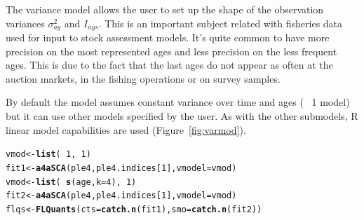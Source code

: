 \documentclass[a4paper,english,10pt]{article}\usepackage[]{graphicx}\usepackage[]{color}
\makeatletter
\newcommand{\hlnum}[1]{\textcolor[rgb]{0.686,0.059,0.569}{#1}}%
\newcommand{\hlopt}[1]{\textcolor[rgb]{0,0,0}{#1}}%
\newcommand{\hlstd}[1]{\textcolor[rgb]{0.345,0.345,0.345}{#1}}%
\newcommand{\hlkwb}[1]{\textcolor[rgb]{0.69,0.353,0.396}{#1}}%
\newcommand{\hlkwc}[1]{\textcolor[rgb]{0.333,0.667,0.333}{#1}}%
\newcommand{\hlkwd}[1]{\textcolor[rgb]{0.737,0.353,0.396}{\textbf{#1}}}%
\newenvironment{kframe}{%
 \def\at@end@of@kframe{}%
 \ifinner\ifhmode%
  \def\at@end@of@kframe{\end{minipage}}%
  \begin{minipage}{\columnwidth}%
 \fi\fi%
 \def\FrameCommand##1{\hskip\@totalleftmargin \hskip-\fboxsep
 \colorbox{shadecolor}{##1}\hskip-\fboxsep
     \hskip-\linewidth \hskip-\@totalleftmargin \hskip\columnwidth}%
 \MakeFramed {\advance\hsize-\width
   \@totalleftmargin\z@ \linewidth\hsize
   \@setminipage}}%
 {\par\unskip\endMakeFramed%
 \at@end@of@kframe}
\newenvironment{knitrout}{}{} %
\makeatother
\begin{document}
The variance model allows the user to set up the shape of the observation variances $\sigma^2_{ay}$ and $I_{ays}$. This is an important subject related with fisheries data used for input to stock assessment models. It's quite common to have more precision on the most represented ages and less precision on the less frequent ages. This is due to the fact that the last ages do not appear as often at the auction markets, in the fishing operations or on survey samples.

By default the model assumes constant variance over time and ages (~ 1 model) but it can use other models specified by the user. As with the other submodels, R linear model capabilities are used (Figure~\ref{fig:varmod}).

\begin{knitrout}
\color{fgcolor}\begin{kframe}
\begin{alltt}
\hlstd{vmod} \hlkwb{<-} \hlkwd{list}\hlstd{(}\hlopt{~}\hlnum{1}\hlstd{,} \hlopt{~}\hlnum{1}\hlstd{)}
\hlstd{fit1} \hlkwb{<-} \hlkwd{a4aSCA}\hlstd{(ple4, ple4.indices[}\hlnum{1}\hlstd{],} \hlkwc{vmodel} \hlstd{= vmod)}
\hlstd{vmod} \hlkwb{<-} \hlkwd{list}\hlstd{(}\hlopt{~}\hlkwd{s}\hlstd{(age,} \hlkwc{k} \hlstd{=} \hlnum{4}\hlstd{),} \hlopt{~}\hlnum{1}\hlstd{)}
\hlstd{fit2} \hlkwb{<-} \hlkwd{a4aSCA}\hlstd{(ple4, ple4.indices[}\hlnum{1}\hlstd{],} \hlkwc{vmodel} \hlstd{= vmod)}
\hlstd{flqs} \hlkwb{<-} \hlkwd{FLQuants}\hlstd{(}\hlkwc{cts} \hlstd{=} \hlkwd{catch.n}\hlstd{(fit1),} \hlkwc{smo} \hlstd{=} \hlkwd{catch.n}\hlstd{(fit2))}
\end{alltt}
\end{kframe}
\end{knitrout}
\end{document}
